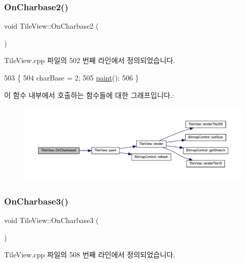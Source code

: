 \subsubsection{\texorpdfstring{On\+Charbase2()}{OnCharbase2()}}
{\footnotesize\ttfamily void Tile\+View\+::\+On\+Charbase2 (\begin{DoxyParamCaption}{ }\end{DoxyParamCaption})\hspace{0.3cm}{\ttfamily [protected]}}



Tile\+View.\+cpp 파일의 502 번째 라인에서 정의되었습니다.


\begin{DoxyCode}
503 \{
504   charBase = 2;
505   \mbox{\hyperlink{class_tile_view_a4341071a0cab0d5a8b6dfa7318230636}{paint}}();
506 \}
\end{DoxyCode}
이 함수 내부에서 호출하는 함수들에 대한 그래프입니다.\+:
\nopagebreak
\begin{figure}[H]
\begin{center}
\leavevmode
\includegraphics[width=350pt]{class_tile_view_ab50f2c2c7575222ee7e4bb72161bbda7_cgraph}
\end{center}
\end{figure}
\mbox{\label{class_tile_view_af0ec3a1a2c7e142612fe13d85c4faa63}} 
\subsubsection{\texorpdfstring{On\+Charbase3()}{OnCharbase3()}}
{\footnotesize\ttfamily void Tile\+View\+::\+On\+Charbase3 (\begin{DoxyParamCaption}{ }\end{DoxyParamCaption})\hspace{0.3cm}{\ttfamily [protected]}}



Tile\+View.\+cpp 파일의 508 번째 라인에서 정의되었습니다.



